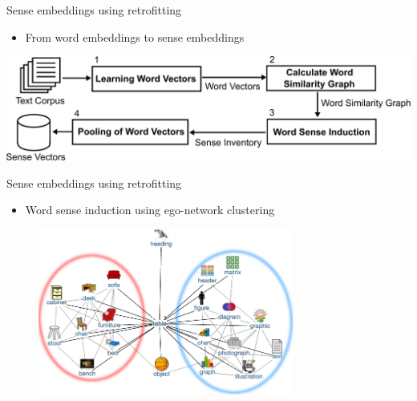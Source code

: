 \begin{frame}{Sense embeddings using retrofitting}
\begin{itemize}
\item From word embeddings to sense embeddings
\end{itemize}
\includegraphics[width=\textwidth]{figures/pipeline-sensegram}

\end{frame}



\begin{frame}{Sense embeddings using retrofitting}

\begin{itemize}
\item Word sense induction using  ego-network clustering
\end{itemize} 
	
\centering
\begin{figure}
\includegraphics[width=0.75\textwidth]{figures/table}
\end{figure}

\end{frame}


